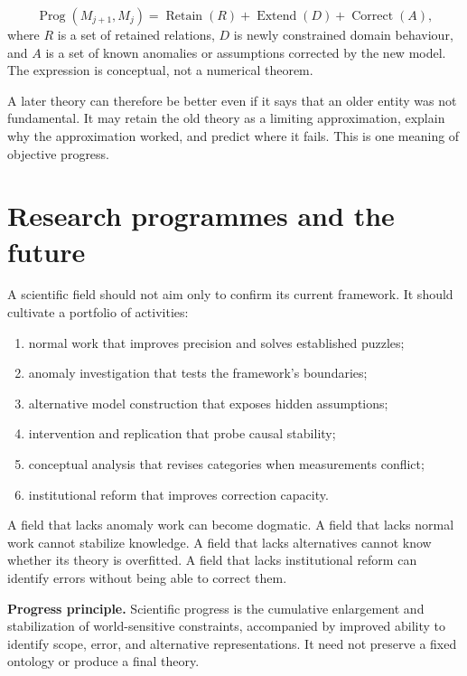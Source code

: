 \[
  \operatorname{Prog}(M_{j+1},M_j)
  =
  \operatorname{Retain}(R)
  +
  \operatorname{Extend}(D)
  +
  \operatorname{Correct}(A),
\]
where \(R\) is a set of retained relations, \(D\) is newly constrained domain
behaviour, and \(A\) is a set of known anomalies or assumptions corrected by the
new model. The expression is conceptual, not a numerical theorem.

A later theory can therefore be better even if it says that an older entity was
not fundamental. It may retain the old theory as a limiting approximation,
explain why the approximation worked, and predict where it fails. This is one
meaning of objective progress.

\section{Research programmes and the future}

A scientific field should not aim only to confirm its current framework. It
should cultivate a portfolio of activities:

\begin{enumerate}
\item normal work that improves precision and solves established puzzles;
\item anomaly investigation that tests the framework's boundaries;
\item alternative model construction that exposes hidden assumptions;
\item intervention and replication that probe causal stability;
\item conceptual analysis that revises categories when measurements conflict;
\item institutional reform that improves correction capacity.
\end{enumerate}

A field that lacks anomaly work can become dogmatic. A field that lacks normal
work cannot stabilize knowledge. A field that lacks alternatives cannot know
whether its theory is overfitted. A field that lacks institutional reform can
identify errors without being able to correct them.

\begin{principlebox}
\textbf{Progress principle.} Scientific progress is the cumulative enlargement
and stabilization of world-sensitive constraints, accompanied by improved
ability to identify scope, error, and alternative representations. It need not
preserve a fixed ontology or produce a final theory.
\end{principlebox}

